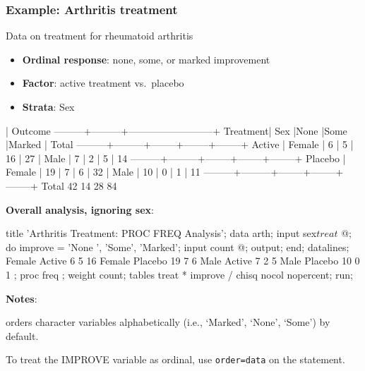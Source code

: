 \begin{frame}[fragile]
  \frametitle{Example: Arthritis treatment}
  Data on treatment for rheumatoid arthritis \citep{KochEdwards:88}
  \begin{itemize}
	\item {\large\bfseries Ordinal response}: none, some, or marked improvement
	\item {\large\bfseries Factor}:  active treatment vs.\ placebo
	\item{\large\bfseries Strata}:  Sex
  \end{itemize}
\begin{listing}
                      |         Outcome
   ---------+---------+--------------------------+
   Treatment|  Sex    |None    |Some    |Marked  |  Total
   ---------+---------+--------+--------+--------+
   Active   |  Female |      6 |      5 |     16 |     27
            |  Male   |      7 |      2 |      5 |     14
   ---------+---------+--------+--------+--------+
   Placebo  |  Female |     19 |      7 |      6 |     32
            |  Male   |     10 |      0 |      1 |     11
   ---------+---------+--------+--------+--------+
   Total                    42       14       28       84
\end{listing}
\end{frame}

\begin{frame}[fragile]
{\bfseries Overall analysis, ignoring sex}:
\begin{Input}[fontsize=\footnotesize,label=\fbox{\texttt{arthfreq.sas} $\cdots$},baselinestretch=0.8]
title 'Arthritis Treatment: PROC FREQ Analysis';
data arth;
   input sex$ treat$ @;
   do improve = 'None  ', 'Some', 'Marked';
      input count @;
      output;
      end;
datalines;
Female  Active    6  5  16
Female  Placebo  19  7   6
Male    Active    7  2   5
Male    Placebo  10  0   1
;
proc freq ;
   weight count;
   tables treat * improve /  chisq nocol nopercent;
   run;
\end{Input}
{\bfseries Notes}:

\begin{itemize*}

  \item {} orders character variables alphabetically (i.e., `Marked', `None', `Some') by
   default.  
  \item To treat the IMPROVE variable as
   ordinal, use \alert{\texttt{order=data}} on the 
   statement.

\end{itemize*}
\end{frame}

